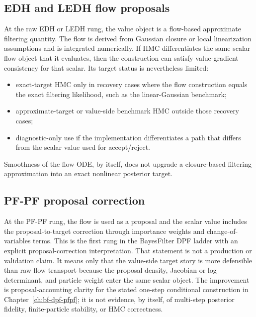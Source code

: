 \subsection{EDH and LEDH flow proposals}

At the raw EDH or LEDH rung, the value object is a flow-based approximate
filtering quantity.  The flow is derived from Gaussian closure or local
linearization assumptions and is integrated numerically.  If HMC differentiates
the same scalar flow object that it evaluates, then the construction can satisfy
value-gradient consistency for that scalar.  Its target status is nevertheless
limited:
\begin{itemize}
  \item exact-target HMC only in recovery cases where the flow construction
    equals the exact filtering likelihood, such as the linear-Gaussian
    benchmark;
  \item approximate-target or value-side benchmark HMC outside those recovery
    cases;
  \item diagnostic-only use if the implementation differentiates a path that
    differs from the scalar value used for accept/reject.
\end{itemize}
Smoothness of the flow ODE, by itself, does not upgrade a closure-based
filtering approximation into an exact nonlinear posterior target.

\subsection{PF-PF proposal correction}

At the PF-PF rung, the flow is used as a proposal and the scalar value includes
the proposal-to-target correction through importance weights and
change-of-variables terms.  This is the first rung in the BayesFilter DPF ladder
with an explicit proposal-correction interpretation.  That statement is not a
production or validation claim.  It means only that the value-side target story
is more defensible than raw flow transport because the proposal density,
Jacobian or log determinant, and particle weight enter the same scalar object.
The improvement is proposal-accounting clarity for the stated one-step
conditional construction in Chapter~\ref{ch:bf-dpf-pfpf}; it is not evidence, by
itself, of multi-step posterior fidelity, finite-particle stability, or HMC
correctness.

